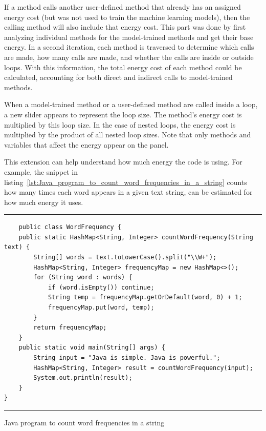 If a method calls another user-defined method that already has an assigned energy cost (but was not used to train the machine learning models), then the calling method will also include that energy cost. This part was done by first analyzing individual methods for the model-trained methods and get their base energy. In a second iteration, each method is traversed to determine which calls are made, how many calls are made, and whether the calls are inside or outside loops. With this information, the total energy cost of each method could be calculated, accounting for both direct and indirect calls to model-trained methods.

When a model-trained method or a user-defined method are called inside a loop, a new slider appears to represent the loop size. The method’s energy cost is multiplied by this loop size. In the case of nested loops, the energy cost is multiplied by the product of all nested loop sizes. Note that only methods and variables that affect the energy appear on the panel.

This extension can help understand how much energy the code is using.
For example, the snippet in listing~\ref{lst:Java_program_to_count_word_frequencies_in_a_string} counts how many times each word appears in a given text string, can be estimated for how much energy it uses.

\begin{listing}[htbp]
\noindent\rule{\linewidth}{0.4pt}
\begin{verbatim}
    public class WordFrequency {
    public static HashMap<String, Integer> countWordFrequency(String text) {
        String[] words = text.toLowerCase().split("\\W+");
        HashMap<String, Integer> frequencyMap = new HashMap<>();
        for (String word : words) {
            if (word.isEmpty()) continue; 
            String temp = frequencyMap.getOrDefault(word, 0) + 1;
            frequencyMap.put(word, temp);
        }
        return frequencyMap;
    }
    public static void main(String[] args) {
        String input = "Java is simple. Java is powerful.";
        HashMap<String, Integer> result = countWordFrequency(input);
        System.out.println(result);
    }
}
\end{verbatim}
\noindent\rule{\linewidth}{0.4pt}
\caption{Java program to count word frequencies in a string}            
\label{lst:Java_program_to_count_word_frequencies_in_a_string}
\end{listing}

